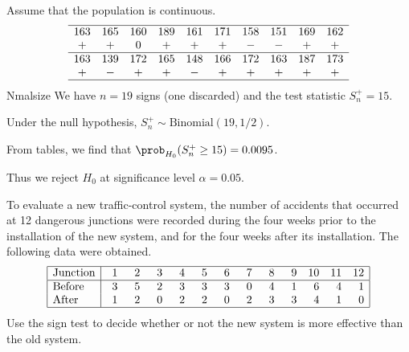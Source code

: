 \begin{solution}
Assume that the population is continuous. 
\small
\[\begin{array}{cccccccccc} \hline
163 & 165 & 160 & 189 & 161 & 171 & 158 & 151 & 169 & 162 \\
+ & + & 0 & + & + & + & - & - & + & + \\ \hline
163 & 139 & 172 & 165 & 148 & 166 & 172 & 163 & 187 & 173 \\
+ & - & + & + & - & + & + & + & + & + \\ \hline
\end{array}\]
 Nmalsize
We have $n=19$ signs (one discarded) and the test statistic $S^{+}_n=15$. 
\par
Under the null hypothesis, $S^{+}_n\sim\text{Binomial}(19,1/2)$. 
\par
From tables, we find that $\prob_{H_0}(S^{+}_n\geq 15) = 0.0095$. 
\par
Thus we reject $H_0$ at significance level $\alpha=0.05$.
\end{solution}

\begin{example}
To evaluate a new traffic-control system, the number of accidents that occurred at 12 dangerous junctions were recorded during the four weeks prior to the installation of the new system, and for the four weeks after its installation. The following data were obtained.
\[\begin{array}{|l|rrrrrrrrrrrr|} \hline
\text{Junction}	& \phantom{1}1 & \phantom{1}2 & \phantom{1}3 & \phantom{1}4 & \phantom{1}5 & \phantom{1}6 & \phantom{1}7 & \phantom{1}8 & \phantom{1}9 & 10 & 11 & 12 \\ \hline
\text{Before}	& 3 & 5 & 2 & 3 & 3 & 3 & 0 & 4 & 1 &  6 &  4 &  1 \\
\text{After}		& 1 & 2 & 0 & 2 & 2 & 0 & 2 & 3 & 3 &  4 &  1 &  0 \\ \hline
\end{array}\]
Use the sign test to decide whether or not the new system is more effective than the old system.
\end{example}

